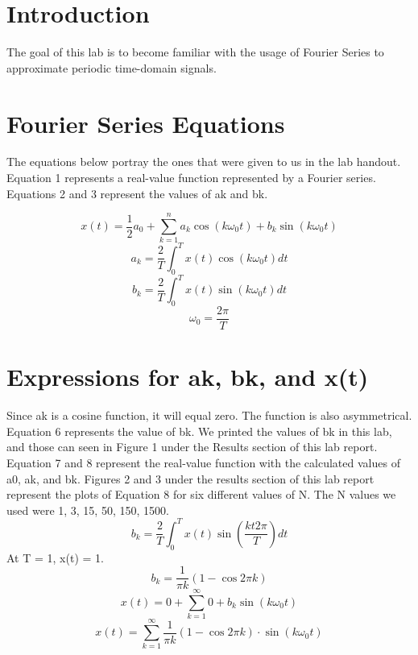 \documentclass[12pt]{report}
\begin{document}
\section{Introduction}
 

The goal of this lab is to become familiar with the usage of Fourier Series to approximate periodic time-domain signals.


   

\section{Fourier Series Equations}
{The equations below portray the ones that were given to us in the lab handout. Equation 1 represents a real-value function represented by a Fourier series. Equations 2 and 3 represent the values of ak and bk.} 
 
 \begin{equation}
    x(t) = \frac{1}{2}a_{0}+\sum_{k=1}^n a_{k}\cos{(k\omega_{0}t)}+b_{k}\sin{(k\omega_{0}t)}
\end{equation}
\begin{equation}
    a_{k} = \frac{2}{T}\int_{0}^T x(t)\cos{(k\omega_{0}t)}dt
\end{equation}
\begin{equation}
    b_{k} = \frac{2}{T}\int_{0}^T x(t)\sin{(k\omega_{0}t)}dt
\end{equation}
\begin{equation}
   \omega_{0} = \frac{2\pi}{T}
\end{equation}


\section{Expressions for ak, bk, and x(t)}
{Since ak is a cosine function, it will equal zero. The function is also asymmetrical. Equation 6 represents the value of bk. We printed the values of bk in this lab, and those can seen in Figure 1 under the Results section of this lab report. Equation 7 and 8 represent the real-value function with the calculated values of a0, ak, and bk. Figures 2 and 3 under the results section of this lab report represent the plots of Equation 8 for six different values of N. The N values we used were 1, 3, 15, 50, 150, 1500.}
\begin{equation}
    b_{k} = \frac{2}{T}\int_{0}^T x(t)\sin{(\frac{kt2\pi}{T})}dt
\end{equation}
{At T = 1, x(t) = 1.}
\begin{equation}
    b_{k} = \frac{1}{\pi k}(1 - \cos{2\pi k})
\end{equation}
\begin{equation}
   x(t) = 0 + \sum_{k=1}^\infty 0 + b_{k}\sin{(k\omega_{0}t)}
\end{equation}
\begin{equation}
   x(t) = \sum_{k=1}^\infty \frac{1}{\pi k}(1 - \cos{2\pi k}) \cdot \sin{(k\omega_{0}t)}
\end{equation}
\end{document}
